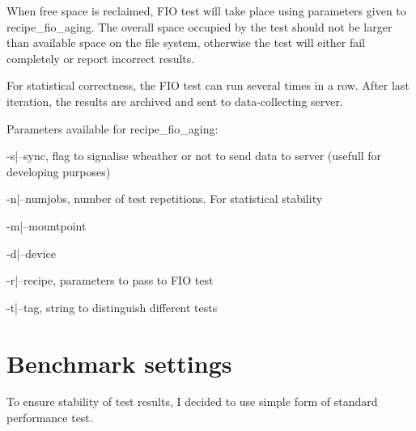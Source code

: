 \documentclass[
  color, %
  table, %
  lof,   %
  lot,   %
]{fithesis3}
\begin{document}
When free space is reclaimed, FIO test will take place using parameters given to recipe\_fio\_aging. The overall space occupied by the test should not be larger than available space on the file system, otherwise the test will either fail completely or report incorrect results.

For statistical correctness, the FIO test can run several times in a row. After last iteration, the results are archived and sent to data-collecting server.

Parameters available for recipe\_fio\_aging:
\begin{compactenum}
  \item -s|--sync, flag to signalise wheather or not to send data to server (usefull for developing purposes)
  \item -n|--numjobs, number of test repetitions. For statistical stability
  \item -m|--mountpoint
  \item -d|--device
  \item -r|--recipe, parameters to pass to FIO test
  \item -t|--tag, string to distinguish different tests
  \end{compactenum}

\section{Benchmark settings}
To ensure stability of test results, I decided to use simple form of standard performance test.


\end{document}
